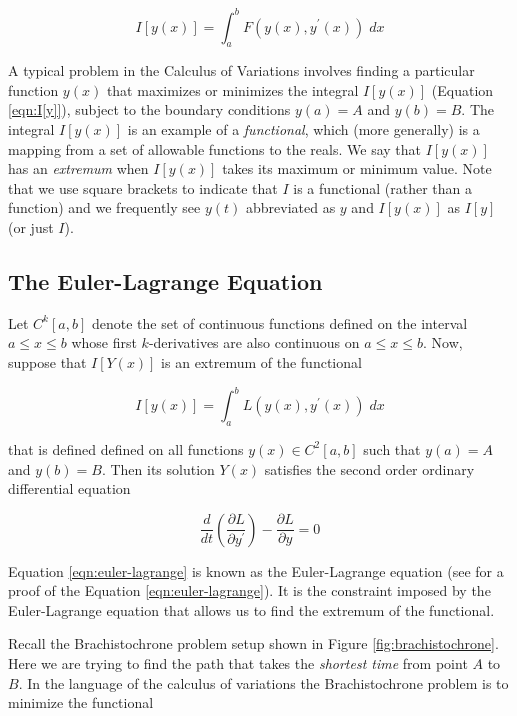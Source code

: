 \documentclass{article}
\theoremstyle{definition}
\begin{document}
\begin{equation}
I[y(x)] = \int_a^b F(y(x), y^{\prime}(x)) \; dx
\label{eqn:I[y]}
\end{equation}

\bigskip
\noindent
A typical problem in the Calculus of Variations involves finding a particular function $y(x)$ that 
maximizes or minimizes the integral $I[y(x)]$ (Equation \ref{eqn:I[y]}), subject to the boundary conditions 
$y(a) = A$ and $y(b) = B$. The integral $I[y(x)]$ is an example of a \emph{functional}, which (more generally) 
is a mapping from a set of allowable functions to the reals. We say that $I[y(x)]$ has an \emph{extremum}
when $I[y(x)]$ takes its maximum or minimum value. Note that we use square brackets to indicate that $I$
is a functional (rather than a function) and we frequently see $y(t)$ abbreviated as $y$ and $I[y(x)]$ 
as $I[y]$ (or just $I$). 

\subsection{The Euler-Lagrange Equation}
\label{subsec:euler-lagrange}
Let $C^k [a,b]$ denote the set of continuous functions defined on the interval $a \leq x \leq b$ whose 
first $k$-derivatives are also continuous on $a \leq x \leq b$. Now, suppose that $I[Y(x)]$ is an 
extremum of the functional

\medskip
\begin{equation*}
I[y(x)] = \int_a^b L(y(x), y^{\prime}(x)) \; dx
\end{equation*}

\bigskip
\noindent
that is defined defined on all functions $y(x) \in C^2 [a,b]$ such that $y(a) = A$ and $y(b) = B$.
Then its solution $Y(x)$ satisfies the second order ordinary differential equation


\bigskip
\begin{equation}
\dfrac{d}{dt} \left ( \dfrac{\partial L}{\partial y^{\prime}} \right ) -  \dfrac{\partial L}{\partial y} = 0
\label{eqn:euler-lagrange}
\end{equation}

\bigskip
\noindent
Equation \ref{eqn:euler-lagrange} is known as the Euler-Lagrange equation (see \cite{notes:pola} for a proof of
the Equation \ref{eqn:euler-lagrange}). It is the constraint imposed by the Euler-Lagrange equation
that allows us to find the extremum of the functional.



\bigskip
\noindent
Recall the Brachistochrone problem setup shown in Figure \ref{fig:brachistochrone}. 
Here we are trying to find the path that takes the \emph{shortest time} from point 
$A$ to $B$. In the language of the calculus of variations \cite{wiki:cov} the 
Brachistochrone problem is to minimize the functional
\end{document}
